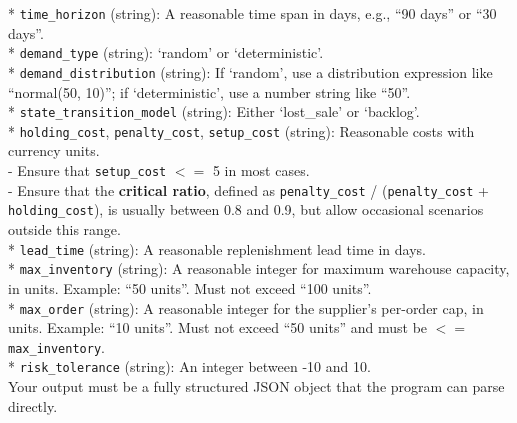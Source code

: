\begin{table}[h]
\begin{tcolorbox}
    * \texttt{time\_horizon} (string): A reasonable time span in days, e.g., ``90 days'' or ``30 days''. \\
    * \texttt{demand\_type} (string): `random' or `deterministic'. \\
    * \texttt{demand\_distribution} (string): If `random', use a distribution expression like ``normal(50, 10)''; if `deterministic', use a number string like ``50''. \\
    * \texttt{state\_transition\_model} (string): Either `lost\_sale' or `backlog'. \\
    * \texttt{holding\_cost}, \texttt{penalty\_cost}, \texttt{setup\_cost} (string): Reasonable costs with currency units. \\
    \hspace*{1em} - Ensure that \texttt{setup\_cost} $<=$ 5 in most cases. \\
    \hspace*{1em} - Ensure that the \textbf{critical ratio}, defined as \texttt{penalty\_cost} / (\texttt{penalty\_cost} + \texttt{holding\_cost}), is usually between 0.8 and 0.9, but allow occasional scenarios outside this range. \\
    * \texttt{lead\_time} (string): A reasonable replenishment lead time in days. \\
    * \texttt{max\_inventory} (string): A reasonable integer for maximum warehouse capacity, in units. Example: ``50 units''. Must not exceed ``100 units''. \\
    * \texttt{max\_order} (string): A reasonable integer for the supplier’s per-order cap, in units. Example: ``10 units''. Must not exceed ``50 units'' and must be $<=$ \texttt{max\_inventory}. \\
    * \texttt{risk\_tolerance} (string): An integer between -10 and 10.\\[0pt]

    Your output must be a fully structured JSON object that the program can parse directly.
    \end{tcolorbox}
    \caption{System prompt for Problem Generator Agent}
    \label{tab:system_prompt_problem_generator}
\end{table}

